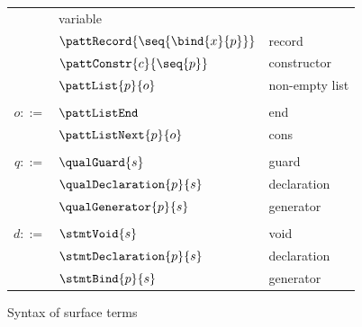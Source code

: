 \begin{figure}
{\begin{minipage}[t]{0.5\textwidth}
\begin{tabularx}{\textwidth}{rL{2.8cm}L{2.9cm}}
      &
      variable
      \\
      &
      $\pattRecord{\seq{\bind{x}{p}}}$
      &
      record
      \\
      &
      $\pattConstr{c}{\seq{p}}$
      &
      constructor
      \\
      &
      $\pattList{p}{o}$
      &
      non-empty list
      \\[2mm]
      &&
      \\
      $o ::=$
      &
      $\pattListEnd$
      &
      end
      \\
      &
      $\pattListNext{p}{o}$
      &
      cons
      \\[2mm]
      &&
      \\
      $q ::=$
      &
      $\qualGuard{s}$
      &
      guard
      \\
      &
      $\qualDeclaration{p}{s}$
      &
      declaration
      \\
      &
      $\qualGenerator{p}{s}$
      &
      generator
      \\[2mm]
      &&
      \\
      $d ::=$
      &
      $\stmtVoid{s}$
      &
      void
      \\
      &
      $\stmtDeclaration{p}{s}$
      &
      declaration
      \\
      &
      $\stmtBind{p}{s}$
      &
      generator
      \end{tabularx}
   \end{minipage}
   }
   \caption{Syntax of surface terms}
\end{figure}
